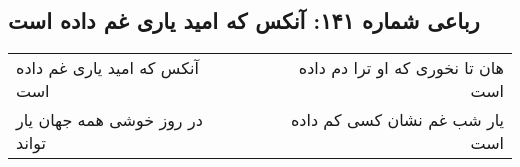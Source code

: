 \begin{center}
\section*{رباعی شماره ۱۴۱: آنکس که امید یاری غم داده است}
\label{sec:0141}
\begin{longtable}{l p{0.5cm} r}
آنکس که امید یاری غم داده است
&&
هان تا نخوری که او ترا دم داده است
\\
در روز خوشی همه جهان یار تواند
&&
یار شب غم نشان کسی کم داده است
\\
\end{longtable}
\end{center}
